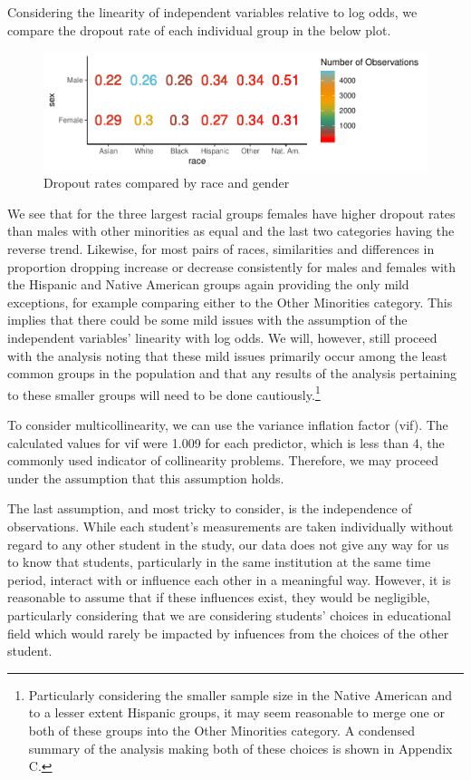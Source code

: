 \documentclass[]{article}
\begin{document}
Considering the linearity of independent variables relative to log odds,
we compare the dropout rate of each individual group in the below plot.

\begin{figure}
\centering
\includegraphics{Stat_461_Final_Project_Report_files/figure-latex/secondplot-1.pdf}
\caption{Dropout rates compared by race and gender}
\end{figure}

We see that for the three largest racial groups females have higher
dropout rates than males with other minorities as equal and the last two
categories having the reverse trend. Likewise, for most pairs of races,
similarities and differences in proportion dropping increase or decrease
consistently for males and females with the Hispanic and Native American
groups again providing the only mild exceptions, for example comparing
either to the Other Minorities category. This implies that there could
be some mild issues with the assumption of the independent variables'
linearity with log odds. We will, however, still proceed with the
analysis noting that these mild issues primarily occur among the least
common groups in the population and that any results of the analysis
pertaining to these smaller groups will need to be done
cautiously.\footnote{Particularly considering the smaller sample size in the Native American and to a lesser extent Hispanic groups, it may seem reasonable to merge one or both of these groups into the Other Minorities category. A condensed summary of the analysis making both of these choices is shown in Appendix C.}

To consider multicollinearity, we can use the variance inflation factor
(vif). The calculated values for vif were 1.009 for each predictor,
which is less than 4, the commonly used indicator of collinearity
problems. Therefore, we may proceed under the assumption that this
assumption holds.

The last assumption, and most tricky to consider, is the independence of
observations. While each student's measurements are taken individually
without regard to any other student in the study, our data does not give
any way for us to know that students, particularly in the same
institution at the same time period, interact with or influence each
other in a meaningful way. However, it is reasonable to assume that if
these influences exist, they would be negligible, particularly
considering that we are considering students' choices in educational
field which would rarely be impacted by infuences from the choices of
the other student.
\end{document}
